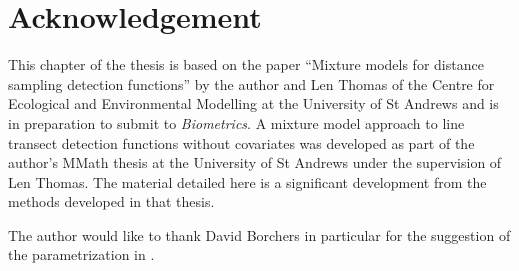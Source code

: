 \section{Acknowledgement}
\label{cor-7s15}

This chapter of the thesis is based on the paper ``Mixture models for distance sampling detection functions'' by the author and Len Thomas of the Centre for Ecological and Environmental Modelling at the University of St Andrews and is in preparation to submit to \textit{Biometrics}. A mixture model approach to line transect detection functions without covariates was developed as part of the author's MMath thesis at the University of St Andrews under the supervision of Len Thomas. The material detailed here is a significant development from the methods developed in that thesis. 

The author would like to thank David Borchers in particular for the suggestion of the parametrization in .



